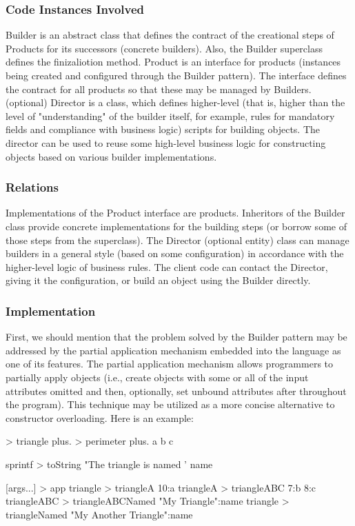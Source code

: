 \documentclass[12pt]{book}
\begin{document}
\subsubsection{Code Instances Involved}
Builder is an abstract class that defines the contract of the creational steps of Products for its successors (concrete builders). Also, the Builder superclass defines the finizaliotion method. 
Product is an interface for products (instances being created and configured through the Builder pattern). The interface defines the contract for all products so that these may be managed by Builders.
(optional) Director is a class, which defines higher-level (that is, higher than the level of "understanding" of the builder itself, for example, rules for mandatory fields and compliance with business logic) scripts for building objects. The director can be used to reuse some high-level business logic for constructing objects based on various builder implementations.

\subsubsection{Relations}
Implementations of the Product interface are products. Inheritors of the Builder class provide concrete implementations for the building steps (or borrow some of those steps from the superclass). The Director (optional entity) class can manage builders in a general style (based on some configuration) in accordance with the higher-level logic of business rules. The client code can contact the Director, giving it the configuration, or build an object using the Builder directly.

\subsubsection{Implementation}
First, we should mention that the problem solved by the Builder pattern may be addressed by the partial application mechanism embedded into the language as one of its features. The partial application mechanism allows programmers to partially apply objects (i.e., create objects with some or all of the input attributes omitted and then, optionally, set unbound attributes after throughout the program). This technique may be utilized as a more concise alternative to constructor overloading. Here is an example:
\begin{ffcode}
[a b c name] > triangle
  plus. > perimeter
    plus.
      a
      b
    c

  sprintf > toString
    "The triangle is named '%
    name


[args...] > app
  triangle > triangleA
    10:a
  triangleA > triangleABC
    7:b
    8:c
  triangleABC > triangleABCNamed
   "My Triangle":name
  triangle > triangleNamed
    "My Another Triangle":name

\end{ffcode}
\end{document}
